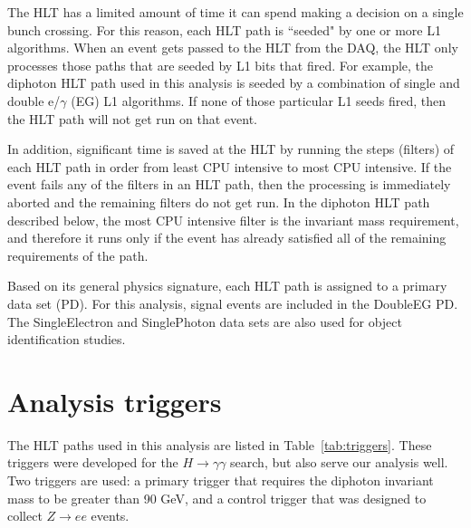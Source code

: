 The HLT has a limited amount of time it can spend making a decision on a single bunch crossing. For this reason, each HLT path is ``seeded" by one or more L1 algorithms. When an event gets passed to the HLT from the DAQ, the HLT only processes those paths that are seeded by L1 bits that fired. 
For example, the diphoton HLT path used in this analysis is seeded by a combination of single and double e/$\gamma$ (EG) L1 algorithms. If none of those particular L1 seeds fired, then the HLT path will not get run on that event. 

In addition, significant time is saved at the HLT by running the steps (filters) of each HLT path in order from least CPU intensive to most CPU intensive. If the event fails any of the filters in an HLT path, then the processing is immediately aborted and the remaining filters do not get run. In the diphoton HLT path described below, the most CPU intensive filter is the invariant mass requirement, and therefore it runs only if the event has already satisfied all of the remaining requirements of the path.

Based on its general physics signature, each HLT path is assigned to a primary data set (PD). For this analysis, signal events are included in the DoubleEG PD. The SingleElectron and SinglePhoton data sets are also used for object identification studies.


\section{Analysis triggers}
\label{sec:analysisTrig}

The HLT paths used in this analysis are listed in Table~\ref{tab:triggers}. These triggers were developed for the $H \rightarrow \gamma\gamma$ search, 
but also serve our analysis well. Two triggers are used: a primary trigger that requires the diphoton invariant mass to be greater than 90 GeV, and a control
trigger that was designed to collect $Z\rightarrow ee$ events. 

